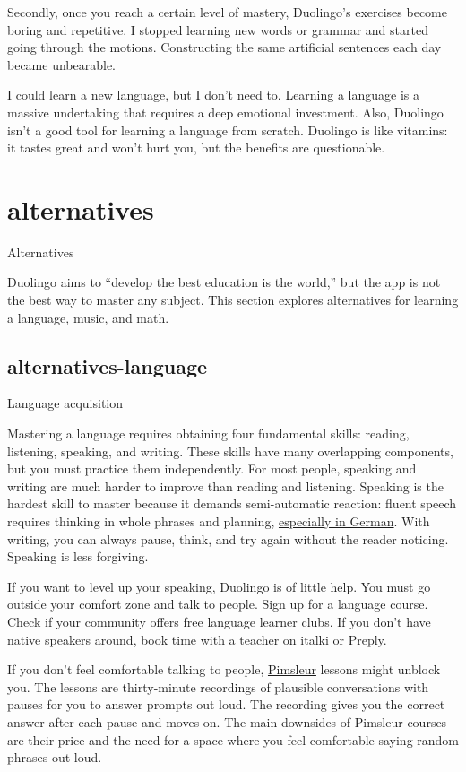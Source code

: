 \documentclass{article}
\begin{document}
Secondly, once you reach a certain level of mastery, Duolingo's exercises become boring and repetitive.
I stopped learning new words or grammar and started going through the motions.
Constructing the same artificial sentences each day became unbearable.

I could learn a new language, but I don't need to.
Learning a language is a massive undertaking that requires a deep emotional investment.
Also, Duolingo isn't a good tool for learning a language from scratch.
Duolingo is like vitamins: it tastes great and won't hurt you,
but the benefits are questionable.

\section{alternatives}{Alternatives}

Duolingo aims to ``develop the best education is the world,''
but the app is not the best way to master any subject.
This section explores alternatives for learning a language, music, and math.

\subsection{alternatives-language}{Language acquisition}

Mastering a language requires obtaining four fundamental skills: reading, listening, speaking, and writing.
These skills have many overlapping components, but you must practice them independently.
For most people, speaking and writing are much harder to improve than reading and listening.
Speaking is the hardest skill to master because it demands semi-automatic reaction:
fluent speech requires thinking in whole phrases and planning, \href{https://en.wikipedia.org/wiki/The_Awful_German_Language}{especially in German}.
With writing, you can always pause, think, and try again without the reader noticing.
Speaking is less forgiving.

If you want to level up your speaking, Duolingo is of little help.
You must go outside your comfort zone and talk to people.
Sign up for a language course.
Check if your community offers free language learner clubs.
If you don't have native speakers around, book time with a teacher on \href{https://www.italki.com}{italki} or \href{https://preply.com}{Preply}.

If you don't feel comfortable talking to people, \href{https://www.pimsleur.com/}{Pimsleur} lessons might unblock you.
The lessons are thirty-minute recordings of plausible conversations with pauses for you to answer prompts out loud.
The recording gives you the correct answer after each pause and moves on.
The main downsides of Pimsleur courses are their price and the need for a space where you feel comfortable saying random phrases out loud.
\end{document}
